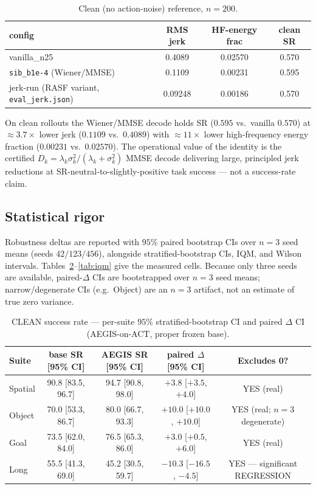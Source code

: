 \begin{table}[h]
\centering
\caption{Clean (no action-noise) reference, $n=200$.}
\label{tab:trackb-clean}
\begin{tabular}{lccc}
\hline
config & RMS jerk & HF-energy frac & clean SR \\
\hline
vanilla\_n25                        & 0.4089 & 0.02570 & 0.570 \\
\texttt{sib\_b1e-4} (Wiener/MMSE)   & 0.1109 & 0.00231 & 0.595 \\
jerk-run (RASF variant, \texttt{eval\_jerk.json}) & 0.09248 & 0.00186 & 0.570 \\
\hline
\end{tabular}
\end{table}

\noindent On clean rollouts the Wiener/MMSE decode holds SR ($0.595$ vs.\ vanilla
$0.570$) at $\approx 3.7\times$ lower jerk ($0.1109$ vs.\ $0.4089$) with
$\approx 11\times$ lower high-frequency energy fraction ($0.00231$ vs.\
$0.02570$). The operational value of the identity is the certified
$D_k=\lambda_k\sigma_k^2/(\lambda_k+\sigma_k^2)$ MMSE decode delivering large,
principled jerk reductions at SR-neutral-to-slightly-positive task success ---
not a success-rate claim.

\subsection{Statistical rigor}

Robustness deltas are reported with $95\%$ paired bootstrap CIs over $n=3$ seed
means (seeds $42/123/456$), alongside stratified-bootstrap CIs, IQM, and Wilson
intervals. Tables~\ref{tab:clean-ci}--\ref{tab:iqm} give the measured cells.
Because only three seeds are available, paired-$\Delta$ CIs are bootstrapped over
$n=3$ seed means; narrow/degenerate CIs (e.g.\ Object) are an $n=3$ artifact, not
an estimate of true zero variance.

\begin{table}[h]
\centering
\caption{CLEAN success rate --- per-suite $95\%$ stratified-bootstrap CI and
paired $\Delta$ CI (AEGIS-on-ACT, proper frozen base).}
\label{tab:clean-ci}
\begin{tabular}{lcccc}
\hline
Suite & base SR [95\% CI] & AEGIS SR [95\% CI] & paired $\Delta$ [95\% CI] & Excludes 0? \\
\hline
Spatial & 90.8 [83.5, 96.7] & 94.7 [90.8, 98.0] & $+3.8$ [$+3.5$, $+4.0$] & YES (real) \\
Object  & 70.0 [53.3, 86.7] & 80.0 [66.7, 93.3] & $+10.0$ [$+10.0$, $+10.0$] & YES (real; $n=3$ degenerate) \\
Goal    & 73.5 [62.0, 84.0] & 76.5 [65.3, 86.0] & $+3.0$ [$+0.5$, $+6.0$] & YES (real) \\
Long    & 55.5 [41.3, 69.0] & 45.2 [30.5, 59.7] & $-10.3$ [$-16.5$, $-4.5$] & YES --- significant REGRESSION \\
\hline
\end{tabular}
\end{table}

